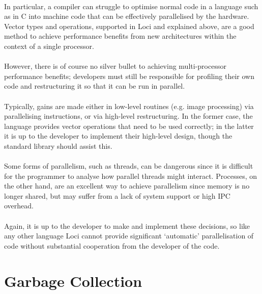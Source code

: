 \documentclass[12pt,twoside,notitlepage]{report}
\begin{document}
\paragraph{}
In particular, a compiler can struggle to optimise normal code in a language such as in C into machine code that can be effectively parallelised by the hardware. Vector types and operations, supported in Loci and explained above, are a good method to achieve performance benefits from new architectures within the context of a single processor.

\paragraph{}
However, there is of course no silver bullet to achieving multi-processor performance benefits; developers must still be responsible for profiling their own code and restructuring it so that it can be run in parallel.

\paragraph{}
Typically, gains are made either in low-level routines (e.g. image processing) via parallelising instructions, or via high-level restructuring. In the former case, the language provides vector operations that need to be used correctly; in the latter it is up to the developer to implement their high-level design, though the standard library should assist this.

\paragraph{}
Some forms of parallelism, such as threads, can be dangerous since it is difficult for the programmer to analyse how parallel threads might interact. Processes, on the other hand, are an excellent way to achieve parallelism since memory is no longer shared, but may suffer from a lack of system support or high IPC overhead.

\paragraph{}
Again, it is up to the developer to make and implement these decisions, so like any other language Loci cannot provide significant `automatic' parallelisation of code without substantial cooperation from the developer of the code.

\section{Garbage Collection}
\end{document}
